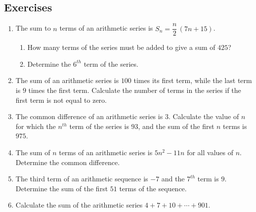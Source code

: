 \subsection{Exercises}
\begin{enumerate}

\item The sum to $n$ terms of an arithmetic series is $S_n = \dfrac{n}{2} \, (7n + 15)$.
\begin{enumerate}
\item{How many terms of the series must be added to give a sum of $425$?}
\item{Determine the $6^{th}$ term of the series.}
\end{enumerate}

\item The sum of an arithmetic series is $100$ times its first term, while the last term is $9$ times the first term. Calculate the number of terms in the series if the first term is not equal to zero.

\item The common difference of an arithmetic series is $3$. Calculate the value of $n$ for which the $n^{th}$ term of the series is $93$, and the sum of the first $n$ terms is $975$.

\item The sum of $n$ terms of an arithmetic series is $5n^2 - 11n$ for all values of $n$. Determine the common difference.

\item{The third term of an arithmetic sequence is $-7$ and the $7^{th}$ term is $9$. Determine the sum of the first $51$ terms of the sequence.}

\item{Calculate the sum of the arithmetic series $4+7+10+\cdots+901$.}
\end{enumerate}


